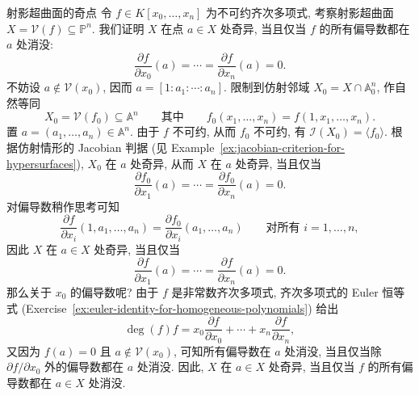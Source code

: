 \begin{Example}{射影超曲面的奇点}\leavevmode\label{ex:singularities-of-projective-hypersurfaces}
令 $f\in K[x_{0},\ldots,x_{n}]$ 为不可约齐次多项式, 考察射影超曲面 $X=\mathcal{V}(f)\subseteq\mathbb{P}^{n}$. 我们证明 $X$ 在点 $a\in X$ 处奇异, 当且仅当 $f$ 的所有偏导数都在 $a$ 处消没:
\[
  \frac{\partial f}{\partial x_{0}}(a)=\cdots=\frac{\partial f}{\partial x_{n}}(a)=0.
\]
不妨设 $a\notin\mathcal{V}(x_{0})$, 因而 $a=[1:a_{1}:\cdots:a_{n}]$. 限制到仿射邻域 $X_{0}=X\cap\mathbb{A}^{n}_{0}$, 作自然等同
\[
  X_{0}=\mathcal{V}(f_{0})\subseteq\mathbb{A}^{n}
  \qquad\text{其中}\qquad
  f_{0}(x_{1},\ldots,x_{n})=f(1,x_{1},\ldots,x_{n}).
\]
置 $a=(a_{1},\ldots,a_{n})\in\mathbb{A}^{n}$. 由于 $f$ 不可约, 从而 $f_{0}$ 不可约, 有 $\mathcal{I}(X_{0})=\langle f_{0}\rangle$. 根据仿射情形的 Jacobian 判据 (见 Example~\ref{ex:jacobian-criterion-for-hypersurfaces}), $X_{0}$ 在 $a$ 处奇异, 从而 $X$ 在 $a$ 处奇异, 当且仅当
\[
  \frac{\partial f_{0}}{\partial x_{1}}(a)=\cdots=\frac{\partial f_{0}}{\partial x_{n}}(a)=0.
\]
对偏导数稍作思考可知
\[
  \frac{\partial f}{\partial x_{i}}(1,a_{1},\ldots,a_{n})
  =\frac{\partial f_{0}}{\partial x_{i}}(a_{1},\ldots,a_{n})
  \qquad\text{对所有 }i=1,\ldots,n,
\]
因此 $X$ 在 $a\in X$ 处奇异, 当且仅当
\[
  \frac{\partial f}{\partial x_{1}}(a)=\cdots=\frac{\partial f}{\partial x_{n}}(a)=0.
\]
那么关于 $x_{0}$ 的偏导数呢? 由于 $f$ 是非常数齐次多项式, 齐次多项式的 Euler 恒等式 (Exercise~\ref{ex:euler-identity-for-homogeneous-polynomials}) 给出
\[
  \deg(f)f=x_{0}\frac{\partial f}{\partial x_{0}}+\cdots+x_{n}\frac{\partial f}{\partial x_{n}},
\]
又因为 $f(a)=0$ 且 $a\notin\mathcal{V}(x_{0})$, 可知所有偏导数在 $a$ 处消没, 当且仅当除 $\partial f/\partial x_{0}$ 外的偏导数都在 $a$ 处消没. 因此, $X$ 在 $a\in X$ 处奇异, 当且仅当 $f$ 的所有偏导数都在 $a\in X$ 处消没.
\end{Example}

